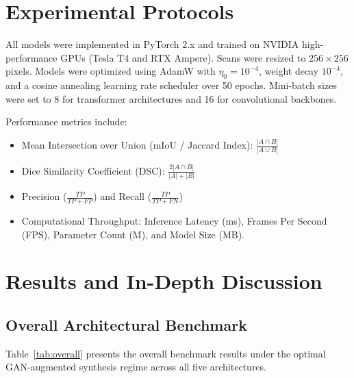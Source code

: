 \documentclass[conference]{IEEEtran}
\begin{document}
\section{Experimental Protocols}
\label{sec:experiments}

All models were implemented in PyTorch 2.x and trained on NVIDIA high-performance GPUs (Tesla T4 and RTX Ampere). Scans were resized to $256 \times 256$ pixels. Models were optimized using AdamW with $\eta_0 = 10^{-4}$, weight decay $10^{-4}$, and a cosine annealing learning rate scheduler over 50 epochs. Mini-batch sizes were set to 8 for transformer architectures and 16 for convolutional backbones. 

Performance metrics include:
\begin{itemize}
    \item Mean Intersection over Union (mIoU / Jaccard Index): $\frac{|A \cap B|}{|A \cup B|}$
    \item Dice Similarity Coefficient (DSC): $\frac{2 |A \cap B|}{|A| + |B|}$
    \item Precision ($\frac{TP}{TP + FP}$) and Recall ($\frac{TP}{TP + FN}$)
    \item Computational Throughput: Inference Latency (ms), Frames Per Second (FPS), Parameter Count (M), and Model Size (MB).
\end{itemize}

\section{Results and In-Depth Discussion}
\label{sec:results}

\subsection{Overall Architectural Benchmark}
Table~\ref{tab:overall} presents the overall benchmark results under the optimal GAN-augmented synthesis regime across all five architectures.
\end{document}
